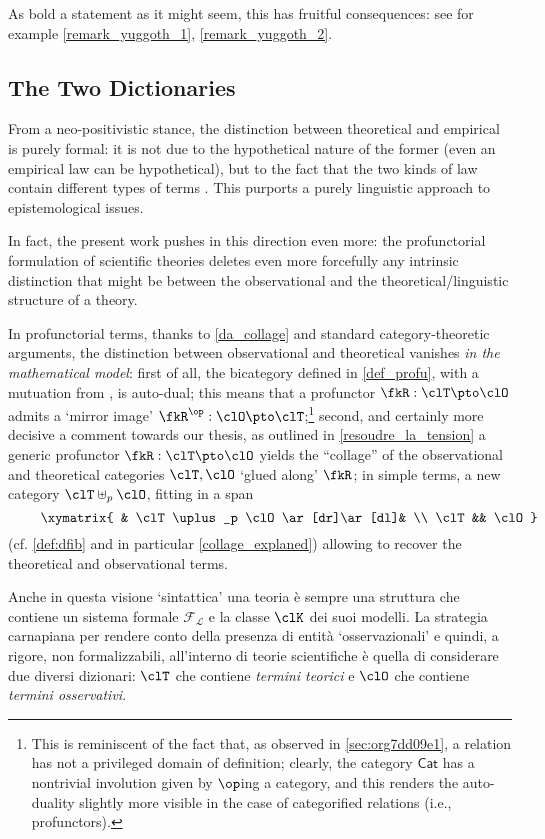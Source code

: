 As bold a statement as it might seem, this has fruitful consequences: see for example \autoref{remark_yuggoth_1}, \autoref{remark_yuggoth_2}.

\subsection{The Two Dictionaries}
From a neo-positivistic stance, the distinction between theoretical and empirical is purely formal: it is not due to the hypothetical nature of the former (even an empirical law can be hypothetical), but to the fact that the two kinds of law contain different types of terms \cite{?}. This purports a purely linguistic approach to epistemological issues. 

In fact, the present work pushes in this direction even more: the profunctorial formulation of scientific theories deletes even more forcefully any intrinsic distinction that might be between the observational and the theoretical\fshyp{}linguistic structure of a theory.

In profunctorial terms, thanks to \autoref{da_collage} and standard category\hyp{}theoretic arguments, the distinction between observational and theoretical vanishes \emph{in the mathematical model}: first of all, the bicategory defined in \autoref{def_profu}, with a mutuation from \cite{benabou2000distributors}, is auto-dual; this means that a profunctor $\fkR : \clT \pto \clO$ admits a `mirror image' $\fkR^\op : \clO \pto \clT$;\footnote{This is reminiscent of the fact that, as observed in \autoref{sec:org7dd09e1}, a relation has not a privileged domain of definition; clearly, the category $\mathsf{Cat}$ has a nontrivial involution given by $\op$ing a category, and this renders the auto-duality slightly more visible in the case of categorified relations (i.e., profunctors).} second, and certainly more decisive a comment towards our thesis, as outlined in \autoref{resoudre_la_tension} a generic profunctor $\fkR : \clT \pto\clO$ yields the ``collage'' of the observational and theoretical categories $\clT,\clO$ `glued along' $\fkR$; in simple terms, a new category $\clT\uplus_p\clO$, fitting in a span 
\[ \vcenter{\xymatrix{
	& \clT\uplus_p \clO \ar[dr]\ar[dl]& \\ 
	\clT  && \clO 
}} \] (cf. \autoref{def:dfib} and in particular \autoref{collage_explaned}) allowing to recover the theoretical and observational terms.
\color{blue!40}
\begin{remark}\label{hint_at_collage}
	Anche in questa visione `sintattica' \cite{giunti2016} una teoria è sempre una struttura che contiene un sistema formale $\mathcal{F_L}$ e la classe $\clK$ dei suoi modelli. La strategia carnapiana per rendere conto della presenza di entità `osservazionali' e quindi, a rigore, non formalizzabili, all'interno di teorie scientifiche è quella di considerare due diversi dizionari: $\clT$ che contiene \emph{termini teorici} e $\clO$ che contiene \emph{termini osservativi}. 
\end{remark}


